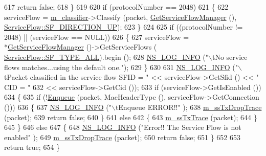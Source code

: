 \begin{DoxyCode}
617       \textcolor{keywordflow}{return} \textcolor{keyword}{false};
618     \}
619 
620   \textcolor{keywordflow}{if} (protocolNumber == 2048)
621     \{
622       serviceFlow = \hyperlink{classns3_1_1SubscriberStationNetDevice_a49577de4017dd8cedb2d51dd9de8ff7e}{m\_classifier}->Classify (packet, 
      \hyperlink{classns3_1_1SubscriberStationNetDevice_a7ad10073f7d4779df6e87e4a3766701a}{GetServiceFlowManager} (), \hyperlink{classns3_1_1ServiceFlow_ae14b8dc8bb371bad10fe078110655d4fadbdc2e453d8d7a126f89ecedca018714}{ServiceFlow::SF\_DIRECTION\_UP});
623     \}
624 
625   \textcolor{keywordflow}{if} ((protocolNumber != 2048) || (serviceFlow == NULL))
626     \{
627       serviceFlow = *\hyperlink{classns3_1_1SubscriberStationNetDevice_a7ad10073f7d4779df6e87e4a3766701a}{GetServiceFlowManager} ()->GetServiceFlows (
      \hyperlink{classns3_1_1ServiceFlow_a7990ba10be1e098328fd1e6382a26235aaf7e58e43027cc9d351cd100a9d6dee3}{ServiceFlow::SF\_TYPE\_ALL}).begin ();
628       \hyperlink{group__logging_gafbd73ee2cf9f26b319f49086d8e860fb}{NS\_LOG\_INFO} (\textcolor{stringliteral}{"\(\backslash\)tNo service flows matches...using the default one."});
629     \}
630 
631   \hyperlink{group__logging_gafbd73ee2cf9f26b319f49086d8e860fb}{NS\_LOG\_INFO} (\textcolor{stringliteral}{"\(\backslash\)tPacket classified in the service flow SFID =  "} << serviceFlow->GetSfid () << \textcolor{stringliteral}{
      " CID = "}
632                                                                   << serviceFlow->GetCid ());
633   \textcolor{keywordflow}{if} (serviceFlow->GetIsEnabled ())
634     \{
635       \textcolor{keywordflow}{if} (!\hyperlink{classns3_1_1SubscriberStationNetDevice_a0a327d87f10438d023569350852a71e7}{Enqueue} (packet, MacHeaderType (), serviceFlow->GetConnection ()))
636         \{
637           \hyperlink{group__logging_gafbd73ee2cf9f26b319f49086d8e860fb}{NS\_LOG\_INFO} (\textcolor{stringliteral}{"\(\backslash\)tEnqueue ERROR!!"} );
638           \hyperlink{classns3_1_1SubscriberStationNetDevice_a8eb77ccf96f4d45b40bc9498be58df47}{m\_ssTxDropTrace} (packet);
639           \textcolor{keywordflow}{return} \textcolor{keyword}{false};
640         \}
641       \textcolor{keywordflow}{else}
642         \{
643           \hyperlink{classns3_1_1SubscriberStationNetDevice_ae35c70c971bddab696265db0c4f85331}{m\_ssTxTrace} (packet);
644         \}
645     \}
646   \textcolor{keywordflow}{else}
647     \{
648       \hyperlink{group__logging_gafbd73ee2cf9f26b319f49086d8e860fb}{NS\_LOG\_INFO} (\textcolor{stringliteral}{"Error!! The Service Flow is not enabled"} );
649       \hyperlink{classns3_1_1SubscriberStationNetDevice_a8eb77ccf96f4d45b40bc9498be58df47}{m\_ssTxDropTrace} (packet);
650       \textcolor{keywordflow}{return} \textcolor{keyword}{false};
651     \}
652 
653   \textcolor{keywordflow}{return} \textcolor{keyword}{true};
654 \}
\end{DoxyCode}


